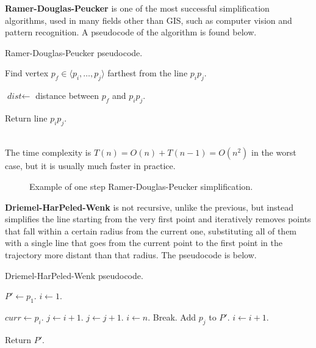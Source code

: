\textbf{Ramer-Douglas-Peucker} is one of the most successful simplification algorithms, used in many fields other than GIS, such as computer vision and pattern recognition. A pseudocode of the algorithm is found below.
\begin{algorithm}
\caption{Ramer-Douglas-Peucker pseudocode.} 
\begin{algorithmic}[1]
    \State{}
    
    \State Find vertex $p_f \in \langle p_i, \dots, p_j \rangle$ farthest from the line $p_i p_j$.
        
    \State $\textit{dist} \gets$ distance between $p_f$ and $p_i p_j$.

        \State {}
        \State {}
    \EndIf

    \State Return line $p_i p_j$.
    \EndFunction
\end{algorithmic}
\end{algorithm} \\
The time complexity is $T(n) = O(n) + T(n-1) = O(n^2)$ in the worst case, but it is usually much faster in practice.
\begin{figure}[!ht]
    \centering
    
    \caption{Example of one step Ramer-Douglas-Peucker simplification.}
    \label{fig:ramer-douglas-peucker}
\end{figure}


\textbf{Driemel-HarPeled-Wenk} is not recursive, unlike the previous, but instead simplifies the line starting from the very first point and iteratively removes points that fall within a certain radius from the current one, substituting all of them with a single line that goes from the current point to the first point in the trajectory more distant than that radius. The pseudocode is below.
\begin{algorithm}
\caption{Driemel-HarPeled-Wenk pseudocode.}
\begin{algorithmic}[1]
     
    
    \State $P' \gets p_1$.
    \State $i \gets 1$.
    
        \State $\textit{curr} \gets p_i$.
        \State $j \gets i+1$.
            \State $j \gets j+1$.
                \State $i \gets n$.
                \State Break. 
            \EndIf
        \EndWhile
        \State Add $p_j$ to $P'$.
        \State $i \gets i + 1$.
    \EndWhile

    \State Return $P'$.
    \EndFunction
\end{algorithmic}
\end{algorithm}

